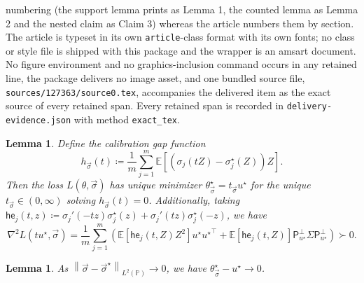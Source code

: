 \documentclass[10pt,a4paper]{amsart}
\theoremstyle{plain}
\newtheorem{lemma}[claim]{Lemma}
\newcommand{\E}{\mathbb{E}}
\newcommand{\Prb}{\mathbb{P}}
\newcommand{\norm}[1]{\left\|{#1}\right\|}
\newcommand{\proj}{\mathsf{P}}
\newcommand{\projperp}{\proj_{u\opt}^\perp}
\newcommand{\defeq}{\coloneqq}
\newcommand{\LtwoP}[1]{\norm{#1}_{L^2(\Prb)}}
\newcommand{\opt}{^\star}
\newcommand{\hessfunc}{\mathsf{he}}
\begin{document}
numbering (the support lemma prints as Lemma 1, the counted lemma as Lemma 2 and the nested claim as Claim 3) whereas the article numbers them by section. The article is typeset in its own \texttt{article}-class format with its own fonts; no class or style file is shipped with this package and the wrapper is an amsart document. No figure environment and no graphics-inclusion command occurs in any retained line, the package delivers no image asset, and one bundled source file, \texttt{sources/127363/source0.tex}, accompanies the delivered item as the exact source of every retained span. Every retained span is recorded in \texttt{delivery-evidence.json} with method \texttt{exact\_tex}.
\begin{lemma}
  \label{lemma:super-generic-solutions}
  Define the calibration gap function
  \begin{equation}
    \label{eqn:general-h-m-func}
    h_{\vec{\sigma}}(t)
    \defeq \frac{1}{m} \sum_{j = 1}^m
    \E\left[\left(\sigma_j(tZ) - \sigma_j\opt(Z)\right) Z\right].
  \end{equation}
  Then the loss $L(\theta, \vec{\sigma})$ has unique
  minimizer $\theta\opt_{\vec{\sigma}} = t_{\vec{\sigma}} u\opt$ for the
  unique $t_{\vec{\sigma}} \in (0, \infty)$ solving
  $h_{\vec{\sigma}}(t) = 0$. Additionally,
  taking
  $\hessfunc_j(t, z) \defeq
  \sigma_j'(-tz) \sigma_j\opt(z) + \sigma_j'(tz) \sigma_j\opt(-z)$,
  we have
  \begin{equation*}
    \nabla^2 L(t u\opt, \vec{\sigma})
    = \frac{1}{m} \sum_{j = 1}^m \left(
    \E[\hessfunc_j(t, Z) Z^2] u\opt {u\opt}^\top
    + \E[\hessfunc_j(t, Z)] \projperp \Sigma \projperp \right)
    \succ 0.
  \end{equation*}
\end{lemma}

\begin{lemma}
	\label{lemma:vec-sigma-theta-continuity}
	As $\LtwoP{\vec{\sigma} - \vec{\sigma}\opt} \to 0$,
	we have $\theta\opt_{\vec{\sigma}} - u\opt \to 0$.
\end{lemma}
\end{document}
